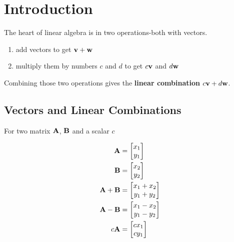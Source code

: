 \chapter{Introduction}

The heart of linear algebra is in two operations-both with vectors.
\begin{enumerate}
  \item add vectors to get $\textbf v + \textbf w$
  \item multiply them by numbers $c$ and $d$ to get $c \textbf v$ and $d \textbf w$
\end{enumerate}
Combining those two operations gives the \textbf{linear combination} $c\textbf v + d \textbf w$.

\section{Vectors and Linear Combinations}

For two matrix $\textbf A$, $\textbf B$ and a scalar $c$

\begin{align*}
  \textbf A &= \begin{bmatrix} x_1 \\ y_1 \end{bmatrix} \\ 
  \textbf B &= \begin{bmatrix} x_2 \\ y_2 \end{bmatrix} \\
  \textbf A + \textbf B &= \begin{bmatrix} x_1 + x_2 \\ y_1 + y_2 \end{bmatrix} \\
  \textbf A - \textbf B &= \begin{bmatrix} x_1 - x_2 \\ y_1 - y_2 \end{bmatrix} \\
  c \textbf A &= \begin{bmatrix} c x_1 \\ c y_1 \end{bmatrix}
\end{align*}




